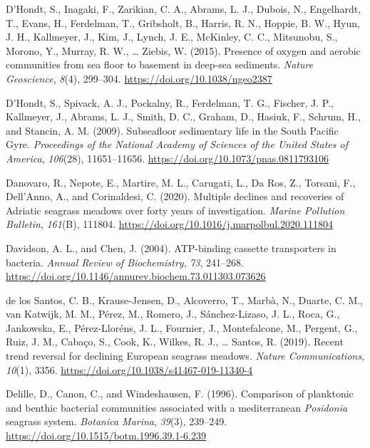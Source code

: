 \documentclass[
  12 pt,
]{book}
\newlength{\cslhangindent}
\newlength{\cslentryspacingunit} %
\newenvironment{CSLReferences}[2] %
 {%
  \setlength{\parindent}{0pt}
  \ifodd #1
  \let\oldpar\par
  \def\par{\hangindent=\cslhangindent\oldpar}
  \fi
  \setlength{\parskip}{#2\cslentryspacingunit}
 }%
 {}
\begin{document}
\begin{CSLReferences}{1}{0}
\leavevmode{}%
D'Hondt, S., Inagaki, F., Zarikian, C. A., Abrams, L. J., Dubois, N., Engelhardt, T., Evans, H., Ferdelman, T., Gribsholt, B., Harris, R. N., Hoppie, B. W., Hyun, J. H., Kallmeyer, J., Kim, J., Lynch, J. E., McKinley, C. C., Mitsunobu, S., Morono, Y., Murray, R. W., \ldots{} Ziebis, W. (2015). Presence of oxygen and aerobic communities from sea floor to basement in deep-sea sediments. \emph{Nature Geoscience}, \emph{8}(4), 299--304. \url{https://doi.org/10.1038/ngeo2387}

\leavevmode{}%
D'Hondt, S., Spivack, A. J., Pockalny, R., Ferdelman, T. G., Fischer, J. P., Kallmeyer, J., Abrams, L. J., Smith, D. C., Graham, D., Hasiuk, F., Schrum, H., and Stancin, A. M. (2009). Subseafloor sedimentary life in the {South Pacific Gyre}. \emph{Proceedings of the National Academy of Sciences of the United States of America}, \emph{106}(28), 11651--11656. \url{https://doi.org/10.1073/pnas.0811793106}

\leavevmode{}%
Danovaro, R., Nepote, E., Martire, M. L., Carugati, L., Da Ros, Z., Torsani, F., Dell'Anno, A., and Corinaldesi, C. (2020). Multiple declines and recoveries of {Adriatic} seagrass meadows over forty years of investigation. \emph{Marine Pollution Bulletin}, \emph{161}(B), 111804. \url{https://doi.org/10.1016/j.marpolbul.2020.111804}

\leavevmode{}%
Davidson, A. L., and Chen, J. (2004). {ATP-binding} cassette transporters in bacteria. \emph{Annual Review of Biochemistry}, \emph{73}, 241--268. \url{https://doi.org/10.1146/annurev.biochem.73.011303.073626}

\leavevmode{}%
de los Santos, C. B., Krause-Jensen, D., Alcoverro, T., Marbà, N., Duarte, C. M., van Katwijk, M. M., Pérez, M., Romero, J., Sánchez-Lizaso, J. L., Roca, G., Jankowska, E., Pérez-Lloréns, J. L., Fournier, J., Montefalcone, M., Pergent, G., Ruiz, J. M., Cabaço, S., Cook, K., Wilkes, R. J., \ldots{} Santos, R. (2019). Recent trend reversal for declining {European} seagrass meadows. \emph{Nature Communications}, \emph{10}(1), 3356. \url{https://doi.org/10.1038/s41467-019-11340-4}

\leavevmode{}%
Delille, D., Canon, C., and Windeshausen, F. (1996). Comparison of planktonic and benthic bacterial communities associated with a mediterranean {{\emph{Posidonia}}} seagrass system. \emph{Botanica Marina}, \emph{39}(3), 239--249. \url{https://doi.org/10.1515/botm.1996.39.1-6.239}


\end{CSLReferences}
\end{document}
